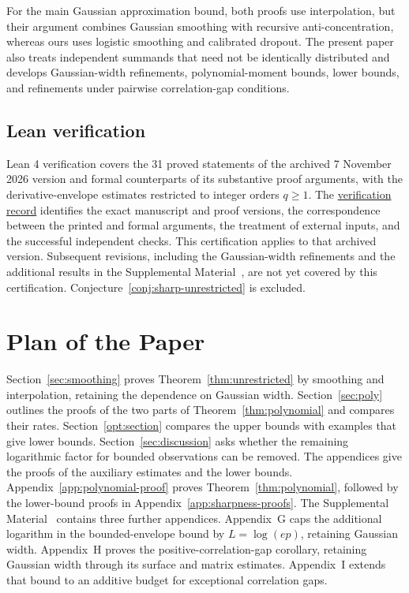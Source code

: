 \documentclass[11pt,letterpaper,twoside,leqno]{article}
\theoremstyle{bookplain}
\theoremstyle{bookremark}
\begin{document}
For the main Gaussian approximation bound, both proofs use interpolation,
but their argument combines Gaussian smoothing with recursive
anti-concentration, whereas ours uses logistic smoothing and calibrated
dropout. The present paper also treats independent summands that need
not be identically distributed and develops Gaussian-width refinements,
polynomial-moment bounds, lower bounds, and refinements under pairwise
correlation-gap conditions.

\subsection{Lean verification}\label{sec:lean-introduction}
Lean 4 verification covers the 31 proved statements of the archived
7 November 2026 version and formal counterparts of its substantive
proof arguments, with the derivative-envelope estimates restricted to
integer orders \(q\ge1\). The
\href{https://github.com/VC2015/rectangle-clt-singular/blob/main/LEAN_VERIFICATION.md}{verification record}
identifies the exact manuscript and proof versions, the correspondence
between the printed and formal arguments, the treatment of external
inputs, and the successful independent checks. This certification
applies to that archived version. Subsequent revisions, including
the Gaussian-width refinements and the additional results in the
Supplemental Material~\cite{Supplement2026},
are not yet covered by this certification.
Conjecture~\ref{conj:sharp-unrestricted} is excluded.

\section*{Plan of the Paper}
{Section~\ref{sec:smoothing} proves Theorem~\ref{thm:unrestricted}
by smoothing and interpolation, retaining the dependence on Gaussian width.}
{Section~\ref{sec:poly} outlines the proofs of the two
parts of Theorem~\ref{thm:polynomial} and compares their rates.}
Section~\ref{opt:section} compares the upper bounds with examples that
give lower bounds. Section~\ref{sec:discussion} asks whether the remaining
logarithmic factor for bounded observations can be removed. The appendices
give the proofs of the auxiliary estimates and the lower bounds.
{Appendix~\ref{app:polynomial-proof} proves
Theorem~\ref{thm:polynomial}, followed by the lower-bound proofs in
Appendix~\ref{app:sharpness-proofs}.}
The Supplemental Material~\cite{Supplement2026} contains three further
appendices. Appendix~G caps the additional logarithm in the
bounded-envelope bound by \(L=\log(ep)\), retaining Gaussian width.
Appendix~H proves the positive-correlation-gap corollary, retaining
Gaussian width through its surface and matrix estimates. Appendix~I
extends that bound to an additive budget for exceptional correlation gaps.
\end{document}
